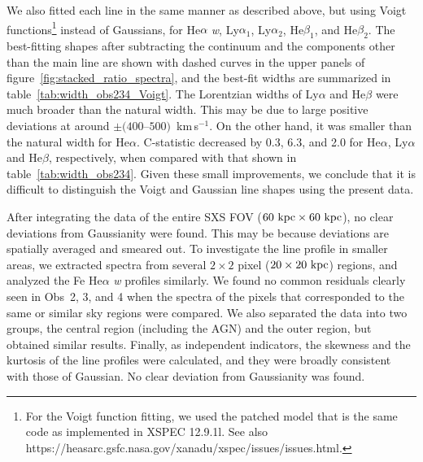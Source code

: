 We also fitted each line in the same manner as described above, but
using Voigt functions\footnote{For the Voigt function fitting, we used
the patched model that is the same code as implemented in XSPEC
12.9.1l. See also
https://heasarc.gsfc.nasa.gov/xanadu/xspec/issues/issues.html.} instead
of Gaussians, for He$\alpha$ {\it w}, Ly$\alpha_1$, Ly$\alpha_2$,
He$\beta_1$, and He$\beta_2$. The best-fitting shapes after subtracting
the continuum and the components other than the main line are shown with
dashed curves in the upper panels of
figure~\ref{fig:stacked_ratio_spectra}, and the best-fit widths are
summarized in table~\ref{tab:width_obs234_Voigt}. The Lorentzian widths
of Ly$\alpha$ and He$\beta$ were much broader than the natural
width. This may be due to large positive deviations at around
$\pm(400$--$500)$~km\,s$^{-1}$. On the other hand, it was smaller
than the natural width for He$\alpha$.  C-statistic decreased by 
0.3, 6.3, and 2.0 for He$\alpha$, Ly$\alpha$ and He$\beta$,
respectively, when compared with that shown in
table~\ref{tab:width_obs234}. Given these small improvements, we
conclude that it is difficult to distinguish the Voigt and Gaussian line
shapes using the present data.

After integrating the data of the entire SXS FOV ($60~{\rm kpc}\times60~{\rm kpc}$), no clear deviations from Gaussianity were found. This may be because deviations are spatially averaged and smeared out. To investigate the line profile in smaller areas, we extracted spectra from several $2\times2$ pixel ($20\times20~{\rm kpc}$) regions, and analyzed the Fe He$\alpha$ {\it w} profiles similarly. We found no common residuals clearly seen in Obs~2, 3, and 4 when the spectra of the pixels that corresponded to the same or similar sky regions were compared. We also separated the data into two groups, the central region (including the AGN) and the outer region, but obtained similar results. Finally, as independent indicators, the skewness and the kurtosis of the line profiles were calculated, and they were broadly consistent with those of Gaussian. No clear deviation from Gaussianity was found.
